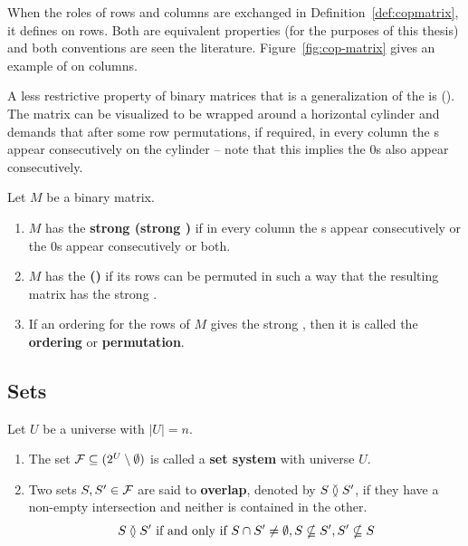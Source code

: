 When the roles of rows and columns are exchanged in
Definition~\ref{def:copmatrix}, it defines \COP on rows. Both
are equivalent properties (for the purposes of this thesis) and both
conventions are seen the literature.
Figure~\ref{fig:cop-matrix} gives an example of \COP on columns.

\figcopmatrix

A less restrictive property of binary matrices that is a
generalization of the \COP is \crop (\CROP). The matrix can be
visualized to be wrapped around a horizontal cylinder and demands that
after some row permutations, if required, in every column the \un s
appear consecutively on the cylinder -- note that this implies the 0s
also appear consecutively.

\begin{definition}
  \label{def:cropmatrix}
  Let $M$ be a binary matrix.
  \begin{enumerate}
  \hangindent {}
  \item $M$ has the \textbf{strong \crop (strong \CROP)} if in every
    column the \un s appear consecutively or the 0s appear
    consecutively or both.
  \item $M$ has the \textbf{\crop (\CROP)} if its rows can be permuted
    in such a way that the resulting matrix has the strong \CROP.
  \item If an ordering for the rows of $M$ gives the strong \CROP,
    then it is called the \textbf{\CROP ordering} or \textbf{\CROP
      permutation}.
  \end{enumerate}
\end{definition}

\subsection{Sets}

\begin{definition}
  \label{def:setsystem}
  Let $U$ be a universe with $|U| = n$.  
  \begin{enumerate}
  \hangindent {}
  \item The set ${\mathcal F} \subseteq (2^{U} \setminus \emptyset)$ is called a
    \textbf{set system} with universe $U$.
  \item Two sets $S, S' \in {\cal F}$ are said to \textbf{overlap}, denoted
    by $S \between S'$, if they have a non-empty intersection and
    neither is contained in the other.
    \[S \overlap S' \text{ \iff\ } S \cap S' \ne \emptyset, S
    \nsubseteq S', S' \nsubseteq S\]
  \end{enumerate}
\end{definition}


